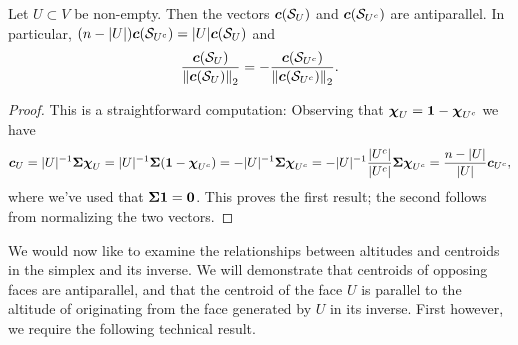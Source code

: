 \begin{lemma}
\label{lem:complimentary_centroids}
Let $U\subset V$ be non-empty. Then the vectors $\vb*{c}(\mathcal{S}_U)$ and $\vb*{c}(\mathcal{S}_{U^c})$ are antiparallel. In particular, $(n-|U|)\vb*{c}(\mathcal{S}_{U^c}) = |U|\vb*{c}(\mathcal{S}_{U})$ and 
\[\frac{\vb*{c}(\mathcal{S}_U)}{\norm{\vb*{c}(\mathcal{S}_U)}_2}=-\frac{\vb*{c}(\mathcal{S}_{U^c})}{\norm{\vb*{c}(\mathcal{S}_{U^c})}_2}.\]
\end{lemma}
\begin{proof}
This is a straightforward computation: Observing that $\boldsymbol{\chi}_U=\vb{1}-\boldsymbol{\chi}_{U^c}$ we have  
\[\vb*{c}_U = |U|^{-1}\boldsymbol{\Sigma}\boldsymbol{\chi}_U = |U|^{-1}\boldsymbol{\Sigma}(\vb{1}-\boldsymbol{\chi}_{U^c})=-|U|^{-1}\boldsymbol{\Sigma}\boldsymbol{\chi}_{U^c}=-|U|^{-1}\frac{|U^c|}{|U^c|}\boldsymbol{\Sigma}\boldsymbol{\chi}_{U^c}=\frac{n-|U|}{|U|}\vb*{c}_{U^c},\]
where we've used that $\boldsymbol{\Sigma}\vb{1}=\vb{0}$. This proves the first result; the second follows from normalizing the two vectors.
\end{proof}

We would now like to examine the relationships between altitudes and centroids in the simplex and its inverse. We will demonstrate that centroids of opposing faces are antiparallel, and that the centroid of the face $U$ is parallel to the altitude of originating from the face generated by $U$ in its inverse. First however, we require the following technical result. 

